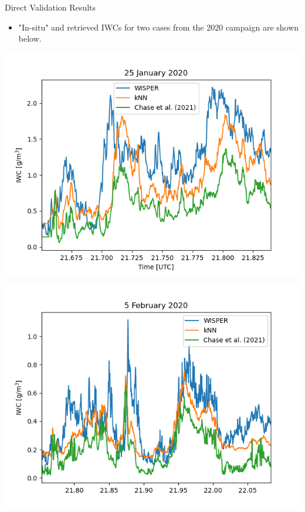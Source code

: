 \documentclass[final,t]{beamer}
\begin{document}
\begin{frame}
\begin{columns}[]
\begin{column}{.32\linewidth}
\begin{block}{Direct Validation Results}
\begin{itemize}
\item
 "In-situ" and retrieved IWCs for two cases from the 2020 campaign are shown below.
 \end{itemize}
\end{block}
  \centerline{\includegraphics[scale=1.25]{jan25_2020.png}}
  
  \centerline{\includegraphics[scale=1.25]{feb05_2020_2.png}}
  
\end{column}



\end{columns}
\end{frame}
\end{document}
